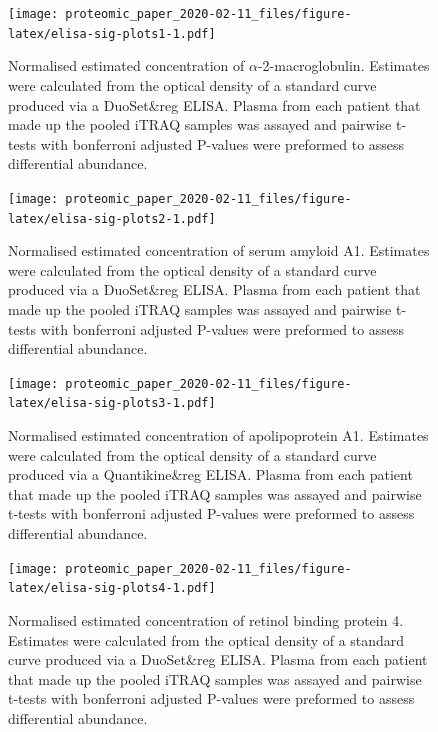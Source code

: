 \documentclass[9pt,lineno]{elife}
\begin{document}
\clearpage



\begin{figure}
\centering
\texttt{[image: proteomic\_paper\_2020-02-11\_files/figure-latex/elisa-sig-plots1-1.pdf]}
\caption{\label{fig:elisa-sig-plots1}Normalised estimated concentration of \(\alpha\)-2-macroglobulin. Estimates were calculated from the optical density of a standard curve produced via a DuoSet\&reg ELISA. Plasma from each patient that made up the pooled iTRAQ samples was assayed and pairwise t-tests with bonferroni adjusted P-values were preformed to assess differential abundance.}
\end{figure}



\begin{figure}
\centering
\texttt{[image: proteomic\_paper\_2020-02-11\_files/figure-latex/elisa-sig-plots2-1.pdf]}
\caption{\label{fig:elisa-sig-plots2}Normalised estimated concentration of serum amyloid A1. Estimates were calculated from the optical density of a standard curve produced via a DuoSet\&reg ELISA. Plasma from each patient that made up the pooled iTRAQ samples was assayed and pairwise t-tests with bonferroni adjusted P-values were preformed to assess differential abundance.}
\end{figure}



\begin{figure}
\centering
\texttt{[image: proteomic\_paper\_2020-02-11\_files/figure-latex/elisa-sig-plots3-1.pdf]}
\caption{\label{fig:elisa-sig-plots3}Normalised estimated concentration of apolipoprotein A1. Estimates were calculated from the optical density of a standard curve produced via a Quantikine\&reg ELISA. Plasma from each patient that made up the pooled iTRAQ samples was assayed and pairwise t-tests with bonferroni adjusted P-values were preformed to assess differential abundance.}
\end{figure}



\begin{figure}
\centering
\texttt{[image: proteomic\_paper\_2020-02-11\_files/figure-latex/elisa-sig-plots4-1.pdf]}
\caption{\label{fig:elisa-sig-plots4}Normalised estimated concentration of retinol binding protein 4. Estimates were calculated from the optical density of a standard curve produced via a DuoSet\&reg ELISA. Plasma from each patient that made up the pooled iTRAQ samples was assayed and pairwise t-tests with bonferroni adjusted P-values were preformed to assess differential abundance.}
\end{figure}
\end{document}
